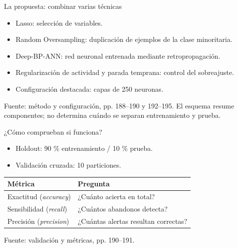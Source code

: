 \documentclass[aspectratio=169,11pt]{beamer}
\begin{document}
\begin{frame}[label={sec:orgeeb8505}]{La propuesta: combinar varias técnicas}
\begin{center}
\end{center}

\begin{itemize}
\item \alert{Lasso}: selección de variables.
\item \alert{Random Oversampling}: duplicación de ejemplos de la clase minoritaria.
\item \alert{Deep-BP-ANN}: red neuronal entrenada mediante retropropagación.
\item \alert{Regularización de actividad y parada temprana}: control del sobreajuste.
\item Configuración destacada: capas de \alert{250 neuronas}.
\end{itemize}

\vfill
\footnotesize Fuente: método y configuración, pp. 188--190 y 192--195. El esquema resume componentes; no determina cuándo se separan entrenamiento y prueba.
\end{frame}
\begin{frame}[label={sec:org2c7eef6}]{¿Cómo comprueban si funciona?}
\begin{itemize}
\item \alert{Holdout}: 90 \% entrenamiento / 10 \% prueba.
\item \alert{Validación cruzada}: 10 particiones.
\end{itemize}

\begin{center}
\begin{tabular}{ll}
\toprule
Métrica & Pregunta\\
\midrule
Exactitud (\emph{accuracy}) & ¿Cuánto acierta en total?\\
Sensibilidad (\emph{recall}) & ¿Cuántos abandonos detecta?\\
Precisión (\emph{precision}) & ¿Cuántas alertas resultan correctas?\\
\bottomrule
\end{tabular}
\end{center}

\vfill
\footnotesize Fuente: validación y métricas, pp. 190--191.
\end{frame}
\end{document}
